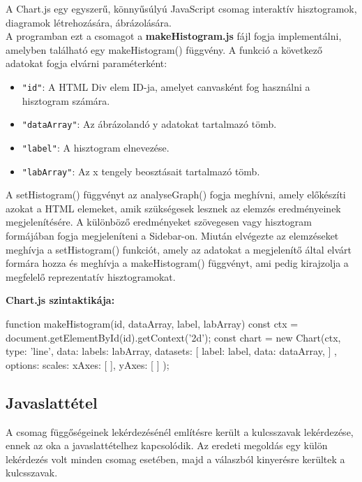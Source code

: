 A Chart.js egy egyszerű, könnyűsúlyú JavaScript csomag interaktív hisztogramok, diagramok létrehozására, ábrázolására.\\

A programban ezt a csomagot a \textbf{makeHistogram.js} fájl fogja implementálni, amelyben található egy makeHistogram() függvény. A funkció a következő adatokat fogja elvárni paraméterként: 

\begin{itemize}
	\item \texttt{"id"}: A HTML Div elem ID-ja, amelyet canvasként fog használni a hisztogram számára.
	\item \texttt{"dataArray"}: Az ábrázolandó y adatokat tartalmazó tömb.
	\item \texttt{"label"}: A hisztogram elnevezése.
	\item \texttt{"labArray"}: Az x tengely beosztásait tartalmazó tömb.
\end{itemize} 

A setHistogram() függvényt az analyseGraph() fogja meghívni, amely előkészíti azokat a HTML elemeket, amik szükségesek lesznek az elemzés eredményeinek megjelenítésére. A különböző eredményeket szövegesen vagy hisztogram formájában fogja megjeleníteni a Sidebar-on. Miután elvégezte az elemzéseket meghívja a setHistogram() funkciót, amely az adatokat a megjelenítő által elvárt formára hozza és meghívja a makeHistogram() függvényt, ami pedig kirajzolja a megfelelő reprezentatív hisztogramokat. 

\pagebreak
 
\noindent\textbf{Chart.js szintaktikája:}
 
\begin{cpp}
function makeHistogram(id, dataArray, label, labArray){
	const ctx = document.getElementById(id).getContext('2d');
	const chart = new Chart(ctx, {
		type: 'line',
		data: {
			labels: labArray,
			datasets: [{
				label: label,
				data: dataArray,
			}]
		},
		options: {
			scales: {
				xAxes: [{
				}],
				yAxes: [{
				}]
			}
		}
	});
}	
\end{cpp}

\subsection{Javaslattétel}

A csomag függőségeinek lekérdezésénél említésre került a kulcsszavak lekérdezése, ennek az oka a javaslattételhez kapcsolódik. Az eredeti megoldás egy külön lekérdezés volt minden csomag esetében, majd a válaszból kinyerésre kerültek a kulcsszavak. 

